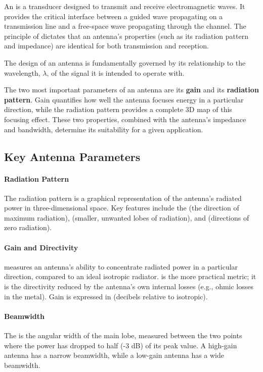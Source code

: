 An  is a transducer designed to transmit and receive electromagnetic waves. It provides the critical interface between a guided wave propagating on a transmission line and a free-space wave propagating through the channel. The principle of  dictates that an antenna's properties (such as its radiation pattern and impedance) are identical for both transmission and reception.

The design of an antenna is fundamentally governed by its relationship to the wavelength, $\lambda$, of the signal it is intended to operate with.

\begin{keyconcept}
    The two most important parameters of an antenna are its \textbf{gain} and its \textbf{radiation pattern}. Gain quantifies how well the antenna focuses energy in a particular direction, while the radiation pattern provides a complete 3D map of this focusing effect. These two properties, combined with the antenna's impedance and bandwidth, determine its suitability for a given application.
\end{keyconcept}


\subsection{Key Antenna Parameters}

\paragraph{Radiation Pattern}
The radiation pattern is a graphical representation of the antenna's radiated power in three-dimensional space. Key features include the  (the direction of maximum radiation),  (smaller, unwanted lobes of radiation), and  (directions of zero radiation).

\paragraph{Gain and Directivity}
 measures an antenna's ability to concentrate radiated power in a particular direction, compared to an ideal isotropic radiator.  is the more practical metric; it is the directivity reduced by the antenna's own internal losses (e.g., ohmic losses in the metal). Gain is expressed in  (decibels relative to isotropic).

\paragraph{Beamwidth}
The  is the angular width of the main lobe, measured between the two points where the power has dropped to half (-3 dB) of its peak value. A high-gain antenna has a narrow beamwidth, while a low-gain antenna has a wide beamwidth.

